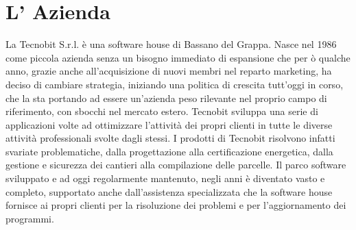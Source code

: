 \section{L' Azienda}
La Tecnobit S.r.l. \`e una software house di Bassano del Grappa. Nasce nel 1986
come piccola azienda senza un bisogno immediato di espansione che per \`o
qualche anno, grazie anche all'acquisizione di nuovi membri nel reparto
marketing, ha deciso di cambiare strategia, iniziando una politica di crescita
tutt'oggi in corso, che la sta portando ad essere un'azienda peso rilevante nel
proprio campo di riferimento, con sbocchi nel mercato estero. Tecnobit sviluppa
una serie di applicazioni volte ad ottimizzare l’attivit\` a dei propri clienti
in tutte le diverse attivit\`a professionali svolte dagli stessi. I prodotti di
Tecnobit risolvono infatti svariate problematiche, dalla progettazione alla
certificazione energetica, dalla gestione e sicurezza dei cantieri alla
compilazione delle parcelle. Il parco software sviluppato e ad oggi regolarmente
mantenuto, negli anni \` e diventato vasto e completo, supportato anche
dall'assistenza specializzata che la software house fornisce ai propri clienti
per la risoluzione dei problemi e per l'aggiornamento dei programmi.

